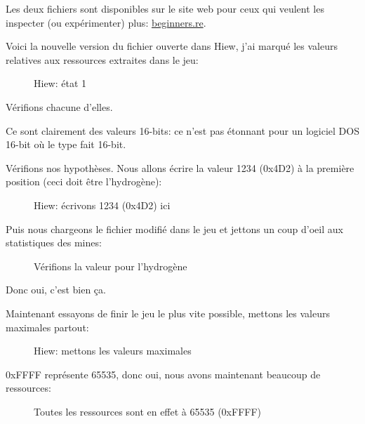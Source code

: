 Les deux fichiers sont disponibles sur le site web pour ceux qui veulent les inspecter
(ou expérimenter) plus:
\href{http://go.yurichev.com/17212}{beginners.re}.

\clearpage
Voici la nouvelle version du fichier ouverte dans Hiew, j'ai marqué les valeurs relatives
aux ressources extraites dans le jeu:

\begin{figure}[H]
\centering
{}
\caption{Hiew: état 1}
\label{fig:mill_hiew3}
\end{figure}

Vérifions chacune d'elles.

Ce sont clairement des valeurs 16-bits: ce n'est pas étonnant pour un logiciel DOS
16-bit où le type \Tint fait 16-bit.

\clearpage
Vérifions nos hypothèses.
Nous allons écrire la valeur 1234 (0x4D2) à la première position (ceci doit être
l'hydrogène):

\begin{figure}[H]
\centering
{}
\caption{Hiew: écrivons 1234 (0x4D2) ici}
\label{fig:mill_hiew4}
\end{figure}

Puis nous chargeons le fichier modifié dans le jeu et jettons un coup d'oeil aux
statistiques des mines:

\begin{figure}[H]
\centering
{}
\caption{Vérifions la valeur pour l'hydrogène}
\label{fig:mill_5}
\end{figure}

Donc oui, c'est bien ça.

\clearpage
Maintenant essayons de finir le jeu le plus vite possible, mettons les valeurs maximales
partout:

\begin{figure}[H]
\centering
{}
\caption{Hiew: mettons les valeurs maximales}
\label{fig:mill_hiew7}
\end{figure}

0xFFFF représente 65535, donc oui, nous avons maintenant beaucoup de ressources:

\begin{figure}[H]
\centering
{}
\caption{Toutes les ressources sont en effet à 65535 (0xFFFF)}
\label{fig:mill_6}
\end{figure}

